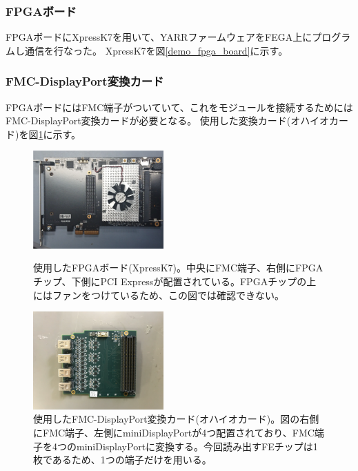 \subsubsection{FPGAボード}
FPGAボードにXpressK7\cite{5-2}を用いて、YARRファームウェアをFEGA上にプログラムし通信を行なった。
XpressK7を図\ref{demo_fpga_board}に示す。

\subsubsection{FMC-DisplayPort変換カード}
FPGAボードにはFMC端子がついていて、これをモジュールを接続するためにはFMC-DisplayPort変換カードが必要となる。
使用した変換カード(オハイオカード)を図\ref{demo_ohio}に示す。

\begin{figure}[htbp]
 \begin{minipage}{0.5\hsize}
  \begin{center}
   \includegraphics[width=50mm]{./fpga_board.png}
  \end{center}
  \caption[使用したFPGAボード(XpressK7)]{使用したFPGAボード(XpressK7\cite{5-2})。中央にFMC端子、右側にFPGAチップ、下側にPCI Expressが配置されている。FPGAチップの上にはファンをつけているため、この図では確認できない。}
  \label{demo_fpga_board}
 \end{minipage}
 \begin{minipage}{0.5\hsize}
  \begin{center}
   \includegraphics[width=50mm]{./ohio.png}
  \end{center}
  \caption[使用したFMC-DisplayPort変換カード(オハイオカード)]{使用したFMC-DisplayPort変換カード(オハイオカード)。図の右側にFMC端子、左側にminiDisplayPortが4つ配置されており、FMC端子を4つのminiDisplayPortに変換する。今回読み出すFEチップは1枚であるため、1つの端子だけを用いる。}
  \label{demo_ohio}
 \end{minipage}
\end{figure}

